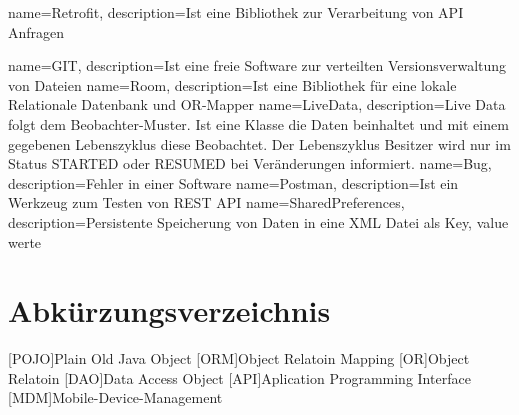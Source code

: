 

{
	name=Retrofit,
	description={Ist eine Bibliothek zur Verarbeitung von API Anfragen}
}

{
	name=GIT,
	description={Ist eine freie Software zur verteilten Versionsverwaltung von Dateien}
}
{
	name=Room,
	description={Ist eine Bibliothek für eine lokale Relationale Datenbank und OR-Mapper}
}
{
	name=LiveData,
	description={Live Data folgt dem Beobachter-Muster. Ist eine Klasse die Daten beinhaltet und mit einem gegebenen Lebenszyklus diese Beobachtet. Der Lebenszyklus Besitzer wird nur im Status STARTED oder RESUMED bei Veränderungen informiert. }
}
{
	name=Bug,
	description={Fehler in einer Software}
}
{
	name=Postman,
	description={Ist ein Werkzeug zum Testen von REST API}
}
{
	name=SharedPreferences,
	description={Persistente Speicherung von Daten in eine XML Datei als Key, value werte}
}


\chapter{Abkürzungsverzeichnis}
\begin{acronym}
	[POJO]{Plain Old Java Object}
	[ORM]{Object Relatoin Mapping}
	[OR]{Object Relatoin}
	[DAO]{Data Access Object}
	[API]{Aplication Programming Interface}
	[MDM]{Mobile-Device-Management}
	
	
\end{acronym}

